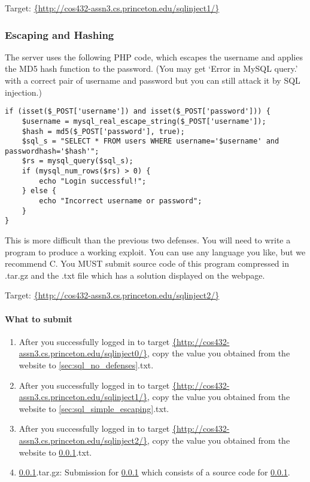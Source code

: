 \documentclass[letterpaper,12pt]{report}
\newcommand{\bungledomain}{http://cos432-assn3.cs.princeton.edu}
\begin{document}
Target: \url{{\bungledomain/sqlinject1/}}\\

\subsubsection{Escaping and Hashing}
\label{sec:sql_md5}
The server uses the following PHP code, which escapes the username and applies the MD5 hash function to the password. (You may get `Error in MySQL query.' with a correct pair of username and password but you can still attack it by SQL injection.)
{\vspace{-10pt}\small\begin{verbatim}
if (isset($_POST['username']) and isset($_POST['password'])) {
    $username = mysql_real_escape_string($_POST['username']);
    $hash = md5($_POST['password'], true);
    $sql_s = "SELECT * FROM users WHERE username='$username' and passwordhash='$hash'";
    $rs = mysql_query($sql_s);
    if (mysql_num_rows($rs) > 0) {
        echo "Login successful!";
    } else {
        echo "Incorrect username or password";
    }
}
\end{verbatim}}
\vspace{-10pt}

This is more difficult than the previous two defenses.  You will need to write a program to produce a working exploit.  You can use any language you like, but we recommend C. You MUST submit source code of this program compressed in .tar.gz and the .txt file which has a solution displayed on the webpage. 
\smallskip

Target: \url{{\bungledomain/sqlinject2/}}

\paragraph{What to submit} 
\begin{enumerate}
\item After you successfully logged in to target \url{{\bungledomain/sqlinject0/}}, copy the value you obtained from the website to {\ref{sec:sql_no_defenses}.txt}.
\item After you successfully logged in to target \url{{\bungledomain/sqlinject1/}}, copy the value you obtained from the website to {\ref{sec:sql_simple_escaping}.txt}.
\item After you successfully logged in to target \url{{\bungledomain/sqlinject2/}}, copy the value you obtained from the website to {\ref{sec:sql_md5}.txt}.
\item {\ref{sec:sql_md5}.tar.gz}: Submission for \ref{sec:sql_md5} which consists of a source code for \ref{sec:sql_md5}.
\end{enumerate}
\end{document}
